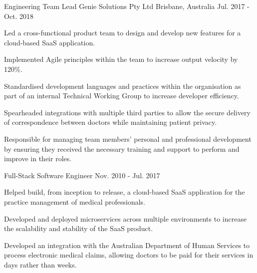 \begin{cventries}
  \cventry
    {Engineering Team Lead} %
    {Genie Solutions Pty Ltd} %
    {Brisbane, Australia} %
    {Jul. 2017 - Oct. 2018} %
    {
      \begin{cvitems} %
        \item {
          Led a cross-functional product team to design and develop new features for a cloud-based SaaS application.
        }
        \item {
          Implemented Agile principles within the team to increase output velocity by 120\%.
        }
        \item {
          Standardised development languages and practices within the organisation as part of an internal Technical
          Working Group to increase developer efficiency.
        }
        \item {
          Spearheaded integrations with multiple third parties to allow the secure delivery of correspondence between
          doctors while maintaining patient privacy.
        }
        \item {
          Responsible for managing team members' personal and professional development by ensuring they received the
          necessary training and support to perform and improve in their roles.
        }
      \end{cvitems}
    }

  \cventry
    {Full-Stack Software Engineer} %
    {} %
    {} %
    {Nov. 2010 - Jul. 2017} %
    {
      \begin{cvitems} %
        \item {
          Helped build, from inception to release, a cloud-based SaaS application for the practice management of
          medical professionals.
        }
        \item {
          Developed and deployed microservices across multiple environments to increase the scalability and stability
          of the SaaS product.
        }
        \item {
          Developed an integration with the Australian Department of Human Services to process electronic medical
          claims, allowing doctors to be paid for their services in days rather than weeks.
        }
      \end{cvitems}
    }


\end{cventries}

